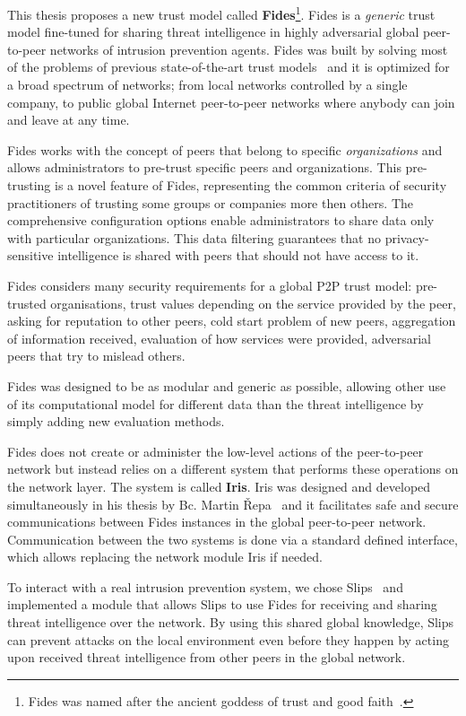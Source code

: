 This thesis proposes a new trust model called \textbf{Fides}\footnote{Fides was named after the ancient goddess of trust and good faith~\cite{enwiki:1086924565}.}.
Fides is a \textit{generic} trust model fine-tuned for sharing threat intelligence in highly adversarial global peer-to-peer networks of intrusion prevention agents.
Fides was built by solving most of the problems of previous state-of-the-art trust models~\cite{sort, dita} and it is optimized for a broad spectrum of networks; from local networks controlled by a single company, to public global Internet peer-to-peer networks where anybody can join and leave at any time.

Fides works with the concept of peers that belong to specific \textit{organizations} and allows administrators to pre-trust specific peers and organizations. This pre-trusting is a novel feature of Fides, representing the common criteria of security practitioners of trusting some groups or companies more then others. The comprehensive configuration options enable administrators to share data only with particular organizations. This data filtering guarantees that no privacy-sensitive intelligence is shared with peers that should not have access to it.

Fides considers many security requirements for a global P2P trust model: pre-trusted organisations, trust values depending on the service provided by the peer, asking for reputation to other peers, cold start problem of new peers, aggregation of information received, evaluation of how services were provided, adversarial peers that try to mislead others.

Fides was designed to be as modular and generic as possible, allowing other use of its computational model for different data than the threat intelligence by simply adding new evaluation methods.

Fides does not create or administer the low-level actions of the peer-to-peer network but instead relies on a different system that performs these operations on the network layer. The system is called \textbf{Iris}. Iris was designed and developed simultaneously in his thesis by Bc. Martin Řepa~\cite{nl} and it facilitates safe and secure communications between Fides instances in the global peer-to-peer network. Communication between the two systems is done via a standard defined interface, which allows replacing the network module Iris if needed.

To interact with a real intrusion prevention system, we chose Slips~\cite{slips} and implemented a module that allows Slips to use Fides for receiving and sharing threat intelligence over the network. 
By using this shared global knowledge, Slips can prevent attacks on the local environment even before they happen by acting upon received threat intelligence from other peers in the global network.


